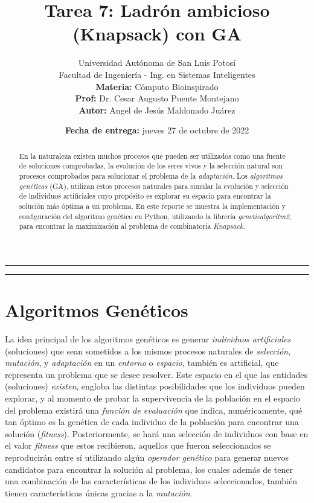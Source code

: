 \documentclass[a4paper, 12pt]{article}
\title{\vspace{-3cm}Tarea 7: Ladrón ambicioso (Knapsack) con GA}
\author{
    Universidad Autónoma de San Luis Potosí\\ 
    Facultad de Ingeniería - Ing. en Sistemas Inteligentes\\ 
    \textbf{Materia:} Cómputo Bioinspirado \\
    \textbf{Prof:} Dr. Cesar Augusto Puente Montejano  \\
    \textbf{Autor:} Angel de Jesús Maldonado Juárez
}
\date{\textbf{Fecha de entrega:} jueves 27 de octubre de 2022}
\begin{document}
\maketitle

\begin{center}
    \rule{\textwidth}{0.5pt}
    \begin{abstract}
        \noindent En la naturaleza existen muchos procesos que pueden ser utilizados como una fuente de soluciones comprobadas, la evolución de los seres vivos y la selección natural son procesos comprobados para solucionar el problema de la \emph{adaptación}. Los \emph{algoritmos genéticos} (GA), utilizan estos procesos naturales para simular la evolución y selección de individuos artificiales cuyo propósito es explorar su espacio para encontrar la solución más óptima a un problema. En este reporte se muestra la implementación y configuración del algoritmo genético en Python, utilizando la librería \emph{geneticalgoritm2}, para encontrar la maximización al problema de combinatoria \emph{Knapsack}.
    \end{abstract}
    \rule{\textwidth}{0.5pt}
\end{center}

\section{Algoritmos Genéticos}
La idea principal de los algoritmos genéticos es generar \emph{individuos artificiales} (soluciones) que sean sometidos a los mismos procesos naturales de \emph{selección}, \emph{mutación}, y \emph{adaptación} en un \emph{entorno} o \emph{espacio}, también es artificial, que representa un problema que se desee resolver. Este espacio en el que las entidades (soluciones) \emph{existen}, engloba las distintas posibilidades que los individuos pueden explorar, y al momento de probar la supervivencia de la población en el espacio del problema existirá una \emph{función de evaluación} que indica, numéricamente, qué tan óptimo es la genética de cada individuo de la población para encontrar una solución (\emph{fitness}). Posteriormente, se hará una selección de individuos con base en el valor \emph{fitness} que estos recibieron, aquellos que fueron seleccionados se reproducirán entre sí utilizando algún \emph{operador genético} para generar nuevos candidatos para encontrar la solución al problema, los cuales además de tener una combinación de las características de los individuos seleccionados, también tienen características únicas gracias a la \emph{mutación}.
\end{document}

